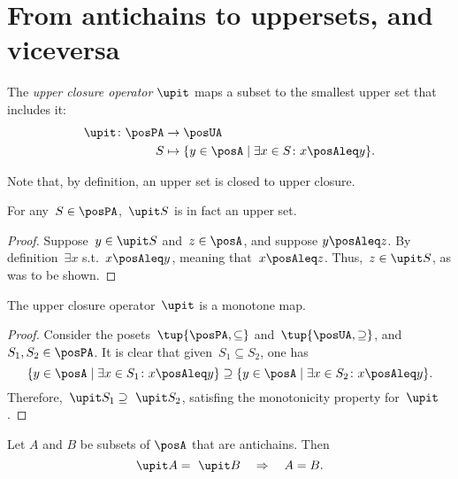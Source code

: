 

\section{From antichains to uppersets, and viceversa}
\begin{definition}
  \label{def:upperclosure}
  The \emph{upper closure operator} $\upit $ maps a subset to the smallest upper set that includes it:
  \begin{equation}
    \begin{aligned}
      \upit  \colon \posPA&\to \posUA \\
      S&\mapsto \{y\in \posA \mid \exists x\in S \colon x\posAleq y\}.
    \end{aligned}
  \end{equation}
\end{definition}
\begin{remark}
  Note that, by definition, an upper set is closed to upper closure.
\end{remark}
\begin{lemma}
  For any~$S\in \posPA$,~$\upit  S$ is in fact an upper set.
\end{lemma}
\begin{proof}
  Suppose~$y\in \upit  S$ and~$z\in \posA$, and suppose $y\posAleq z$. By definition~$\exists x$ s.t.~$x\posAleq y$, meaning that~$x\posAleq z$. Thus,~$z\in \upit  S$, as was to be shown.
\end{proof}


\begin{lemma}
  The upper closure operator~$\upit $ is a monotone map.
\end{lemma}
\begin{proof}
  Consider the posets~$\tup{\posPA,\subseteq}$ and~$\tup{\posUA ,\supseteq}$, and~$S_1,S_2\in \posPA$. It is clear that given~$S_1\subseteq S_2$, one has
  \begin{equation*}
    \{y\in \posA\mid \exists x\in S_1\colon x\posAleq y\} \supseteq \{y\in \posA\mid \exists x\in S_2\colon x\posAleq y\}.
  \end{equation*}
  Therefore,~$\upit  S_1\supseteq \ \upit  S_2$, satisfing the monotonicity property for~$\upit $.
\end{proof}

\begin{lemma}
  \label{up-cl-inj-antichains}
  Let $A$ and $B$ be subsets of $\posA$ that are antichains. Then
  \begin{equation*}
    \upit  A = \ \upit  B \quad \Rightarrow \quad A = B.
  \end{equation*}
\end{lemma}


